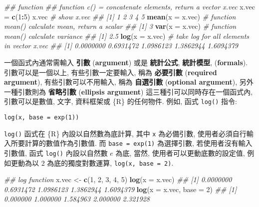 \documentclass[
]{book}
\newenvironment{Shaded}{\begin{snugshade}}{\end{snugshade}}
\newcommand{\CommentTok}[1]{\textcolor[rgb]{0.56,0.35,0.01}{\textit{#1}}}
\newcommand{\DataTypeTok}[1]{\textcolor[rgb]{0.13,0.29,0.53}{#1}}
\newcommand{\DecValTok}[1]{\textcolor[rgb]{0.00,0.00,0.81}{#1}}
\newcommand{\KeywordTok}[1]{\textcolor[rgb]{0.13,0.29,0.53}{\textbf{#1}}}
\newcommand{\NormalTok}[1]{#1}
\newcommand{\OperatorTok}[1]{\textcolor[rgb]{0.81,0.36,0.00}{\textbf{#1}}}
\newcommand{\StringTok}[1]{\textcolor[rgb]{0.31,0.60,0.02}{#1}}
\begin{document}
\begin{Shaded}
\begin{Highlighting}[]
\CommentTok{\#\# function}
\CommentTok{\#\# function c() = concatenate elements, return a vector x.vec}
\NormalTok{x.vec =}\StringTok{ }\KeywordTok{c}\NormalTok{(}\DecValTok{1}\OperatorTok{:}\DecValTok{5}\NormalTok{) }
\NormalTok{x.vec }\CommentTok{\# show x.vec }
\CommentTok{\#\# [1] 1 2 3 4 5}
\KeywordTok{mean}\NormalTok{(}\DataTypeTok{x =}\NormalTok{ x.vec) }\CommentTok{\# function mean() calculate mean, return a scalar}
\CommentTok{\#\# [1] 3}
\KeywordTok{var}\NormalTok{(}\DataTypeTok{x =}\NormalTok{ x.vec)  }\CommentTok{\# function mean() calculate variance}
\CommentTok{\#\# [1] 2.5}
\KeywordTok{log}\NormalTok{(}\DataTypeTok{x =}\NormalTok{ x.vec)  }\CommentTok{\# take log for all elements in vector x.vec}
\CommentTok{\#\# [1] 0.0000000 0.6931472 1.0986123 1.3862944 1.6094379}
\end{Highlighting}
\end{Shaded}

一個函式內通常需輸入
\textbf{引數}
(\textbf{argument})
或是
\textbf{統計公式},
\textbf{統計模型},
(\textbf{formals}).
引數可以是一個以上,
有些引數一定要輸入,
稱為
\textbf{必要引數}
(\textbf{required argument}),
有些引數可以不用輸入,
稱為
\textbf{自選引數}
(\textbf{optional argument}),
另外一種引數則為
\textbf{省略引數}
(\textbf{ellipsis argument})
這三種引可以同時存在一個函式內,
引數可以是數值, 文字, 資料框架或 \{R\} 的任何物件.
例如, 函式 \texttt{log()} 指令:

\begin{verbatim}
log(x, base = exp(1))     
\end{verbatim}

\texttt{log()} 函式在 \{R\} 內設以自然數為底計算,
其中 \texttt{x} 為必備引數,
使用者必須自行輸入所要計算的數值作為引數值.
而 \texttt{base\ =\ exp(1)}
為選擇引數,
若使用者沒有輸入引數值,
函式 \texttt{log()} 內設以自然數 \(e\) 為底,
當然, 使用者可以更動底數的設定值,
例如更動為以 \(2\) 為底的獨度對數運算,
\texttt{log(x,\ base\ =\ 2)}.

\begin{Shaded}
\begin{Highlighting}[]
\CommentTok{\#\# log function}
\NormalTok{x.vec \textless{}{-}}\StringTok{ }\KeywordTok{c}\NormalTok{(}\DecValTok{1}\NormalTok{, }\DecValTok{2}\NormalTok{, }\DecValTok{3}\NormalTok{, }\DecValTok{4}\NormalTok{, }\DecValTok{5}\NormalTok{)}
\KeywordTok{log}\NormalTok{(}\DataTypeTok{x =}\NormalTok{ x.vec)}
\CommentTok{\#\# [1] 0.0000000 0.6931472 1.0986123 1.3862944 1.6094379}
\KeywordTok{log}\NormalTok{(}\DataTypeTok{x =}\NormalTok{ x.vec, }\DataTypeTok{base =} \DecValTok{2}\NormalTok{)}
\CommentTok{\#\# [1] 0.000000 1.000000 1.584963 2.000000 2.321928}
\end{Highlighting}
\end{Shaded}
\end{document}
